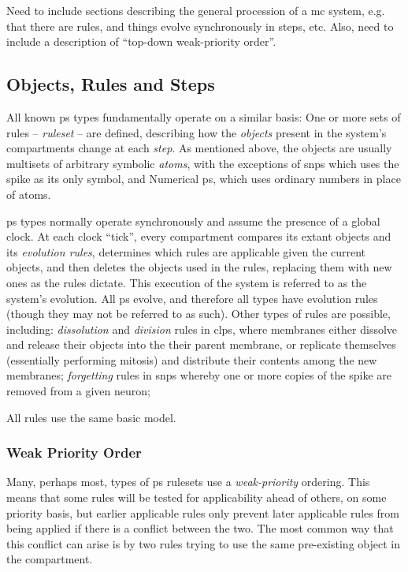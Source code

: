 \begin{anfxerror}
Need to include sections describing the general procession of a \gls{mc} system, e.g. that there are rules, and things evolve synchronously in steps, etc.  Also, need to include a description of ``top-down weak-priority order''.
\end{anfxerror}

\subsection{Objects, Rules and Steps}
All known \gls{ps} types fundamentally operate on a similar basis:  One or more sets of rules -- \emph{\gls{ruleset}} -- are defined, describing how the \emph{objects} present in the system's compartments change at each \emph{step}.  As mentioned above, the objects are usually multisets of arbitrary symbolic \emph{atoms}, with the exceptions of \gls{snps} which uses the spike as its only symbol, and Numerical \gls{ps}, which uses ordinary numbers in place of atoms.

\Gls{ps} types normally operate synchronously and assume the presence of a global clock.  At each clock ``tick'', every compartment compares its extant objects and its \emph{evolution rules}, determines which rules are applicable given the current objects, and then deletes the objects used in the rules, replacing them with new ones as the rules dictate.  This execution of the system is referred to as the system's evolution.  All \gls{ps} evolve, and therefore all types have evolution rules (though they may not be referred to as such).  Other types of rules are possible, including: \emph{dissolution} and \emph{division} rules in \gls{clps}, where membranes either dissolve and release their objects into the their parent membrane, or replicate themselves (essentially performing mitosis) and distribute their contents among the new membranes; \emph{forgetting} rules in \gls{snps} whereby one or more copies of the spike are removed from a given neuron;

All rules use the same basic model.  

\subsubsection{Weak Priority Order}

Many, perhaps most, types of \gls{ps} \glspl{ruleset} use a \emph{weak-priority} ordering.  This means that some rules will be tested for applicability ahead of others, on some priority basis, but earlier applicable rules only prevent later applicable rules from being applied if there is a conflict between the two.  The most common way that this conflict can arise is by two rules trying to use the same pre-existing object in the compartment.


